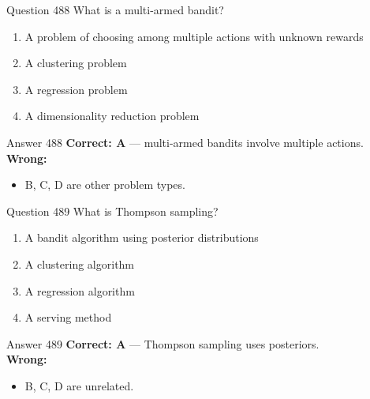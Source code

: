 \documentclass[aspectratio=169,11pt]{beamer}
\begin{document}
	\begin{frame}{Question 488}
		What is a multi-armed bandit?
		\begin{enumerate}[label=\Alph*.]
			\item A problem of choosing among multiple actions with unknown rewards
			\item A clustering problem
			\item A regression problem
			\item A dimensionality reduction problem
		\end{enumerate}
	\end{frame}
	\begin{frame}{Answer 488}
		\textbf{Correct: A} --- multi-armed bandits involve multiple actions.\\
		\vspace{0.5em}
		\textbf{Wrong:}
		\begin{itemize}
			\item B, C, D are other problem types.
		\end{itemize}
	\end{frame}
	
	\begin{frame}{Question 489}
		What is Thompson sampling?
		\begin{enumerate}[label=\Alph*.]
			\item A bandit algorithm using posterior distributions
			\item A clustering algorithm
			\item A regression algorithm
			\item A serving method
		\end{enumerate}
	\end{frame}
	\begin{frame}{Answer 489}
		\textbf{Correct: A} --- Thompson sampling uses posteriors.\\
		\vspace{0.5em}
		\textbf{Wrong:}
		\begin{itemize}
			\item B, C, D are unrelated.
		\end{itemize}
	\end{frame}
	
\end{document}
